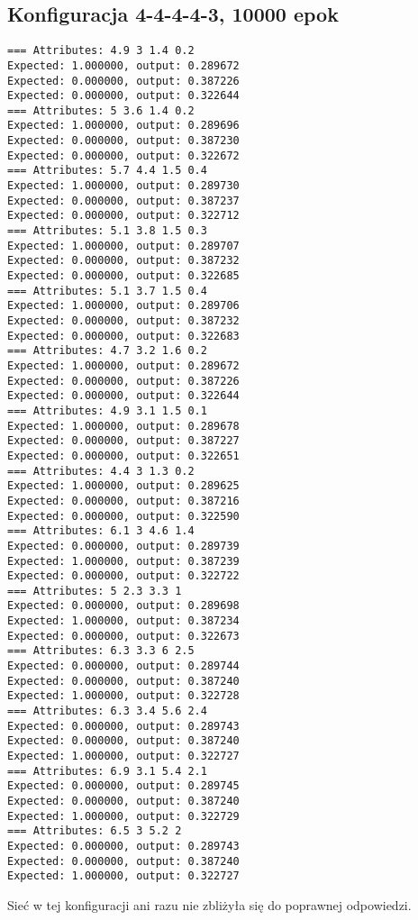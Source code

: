 \documentclass{classrep}
\begin{document}
\subsection{Konfiguracja 4-4-4-4-3, 10000 epok}
\begin{lstlisting}[basicstyle=\small]
=== Attributes: 4.9 3 1.4 0.2 
Expected: 1.000000, output: 0.289672
Expected: 0.000000, output: 0.387226
Expected: 0.000000, output: 0.322644
=== Attributes: 5 3.6 1.4 0.2 
Expected: 1.000000, output: 0.289696
Expected: 0.000000, output: 0.387230
Expected: 0.000000, output: 0.322672
=== Attributes: 5.7 4.4 1.5 0.4 
Expected: 1.000000, output: 0.289730
Expected: 0.000000, output: 0.387237
Expected: 0.000000, output: 0.322712
=== Attributes: 5.1 3.8 1.5 0.3 
Expected: 1.000000, output: 0.289707
Expected: 0.000000, output: 0.387232
Expected: 0.000000, output: 0.322685
=== Attributes: 5.1 3.7 1.5 0.4 
Expected: 1.000000, output: 0.289706
Expected: 0.000000, output: 0.387232
Expected: 0.000000, output: 0.322683
=== Attributes: 4.7 3.2 1.6 0.2 
Expected: 1.000000, output: 0.289672
Expected: 0.000000, output: 0.387226
Expected: 0.000000, output: 0.322644
=== Attributes: 4.9 3.1 1.5 0.1 
Expected: 1.000000, output: 0.289678
Expected: 0.000000, output: 0.387227
Expected: 0.000000, output: 0.322651
=== Attributes: 4.4 3 1.3 0.2 
Expected: 1.000000, output: 0.289625
Expected: 0.000000, output: 0.387216
Expected: 0.000000, output: 0.322590
=== Attributes: 6.1 3 4.6 1.4 
Expected: 0.000000, output: 0.289739
Expected: 1.000000, output: 0.387239
Expected: 0.000000, output: 0.322722
=== Attributes: 5 2.3 3.3 1 
Expected: 0.000000, output: 0.289698
Expected: 1.000000, output: 0.387234
Expected: 0.000000, output: 0.322673
=== Attributes: 6.3 3.3 6 2.5 
Expected: 0.000000, output: 0.289744
Expected: 0.000000, output: 0.387240
Expected: 1.000000, output: 0.322728
=== Attributes: 6.3 3.4 5.6 2.4 
Expected: 0.000000, output: 0.289743
Expected: 0.000000, output: 0.387240
Expected: 1.000000, output: 0.322727
=== Attributes: 6.9 3.1 5.4 2.1 
Expected: 0.000000, output: 0.289745
Expected: 0.000000, output: 0.387240
Expected: 1.000000, output: 0.322729
=== Attributes: 6.5 3 5.2 2 
Expected: 0.000000, output: 0.289743
Expected: 0.000000, output: 0.387240
Expected: 1.000000, output: 0.322727
\end{lstlisting}

Sieć w tej konfiguracji ani razu nie zbliżyła się do poprawnej odpowiedzi.
\end{document}
